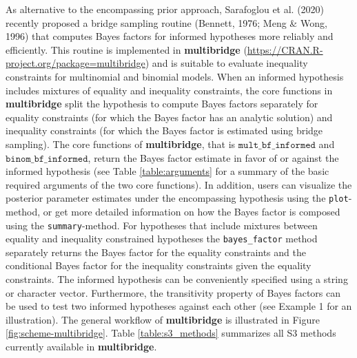 \documentclass[
  english,
  man,floatsintext]{apa6}
\begin{document}
As alternative to the encompassing prior approach, Sarafoglou et al. (2020) recently proposed a bridge sampling routine (Bennett, 1976; Meng \& Wong, 1996) that computes Bayes factors for informed hypotheses more reliably and efficiently. This routine is implemented in \textbf{multibridge} (\url{https://CRAN.R-project.org/package=multibridge}) and is suitable to evaluate inequality constraints for multinomial and binomial models. When an informed hypothesis includes mixtures of equality and inequality constraints, the core functions in \textbf{multibridge} split the hypothesis to compute Bayes factors separately for equality constraints (for which the Bayes factor has an analytic solution) and inequality constraints (for which the Bayes factor is estimated using bridge sampling). The core functions of \textbf{multibridge}, that is \(\texttt{mult\_bf\_informed}\) and \(\texttt{binom\_bf\_informed}\), return the Bayes factor estimate in favor of or against the informed hypothesis (see Table \ref{table:arguments} for a summary of the basic required arguments of the two core functions). In addition, users can visualize the posterior parameter estimates under the encompassing hypothesis using the \texttt{plot}-method, or get more detailed information on how the Bayes factor is composed using the \texttt{summary}-method. For hypotheses that include mixtures between equality and inequality constrained hypotheses the \texttt{bayes\_factor} method separately returns the Bayes factor for the equality constraints and the conditional Bayes factor for the inequality constraints given the equality constraints. The informed hypothesis can be conveniently specified using a string or character vector. Furthermore, the transitivity property of Bayes factors can be used to test two informed hypotheses against each other (see Example 1 for an illustration). The general workflow of \textbf{multibridge} is illustrated in Figure \ref{fig:scheme-multibridge}. Table \ref{table:s3_methods} summarizes all S3 methods currently available in \textbf{multibridge}.
\end{document}
